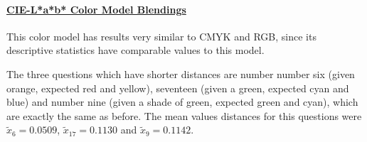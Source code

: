 \paragraph{\ul{CIE-L*a*b* Color Model Blendings}} \par
\label{par:labcolormodel}
%
This color model has results very similar to CMYK and RGB, since its descriptive statistics have comparable values to this model. \par
%
The three questions which have shorter distances are number number six (given orange, expected red and yellow), seventeen (given a green, expected cyan and blue) and number nine (given a shade
of green, expected green and cyan), which are exactly the same as before. The mean values distances for this questions were $\tilde{x}_{6} = 0.0509$, $\tilde{x}_{17} = 0.1130$ and $\tilde{x}_{9} = 0.1142$. \par
%
